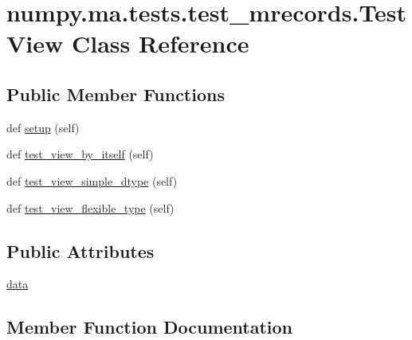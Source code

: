 \hypertarget{classnumpy_1_1ma_1_1tests_1_1test__mrecords_1_1TestView}{}\section{numpy.\+ma.\+tests.\+test\+\_\+mrecords.\+Test\+View Class Reference}
\label{classnumpy_1_1ma_1_1tests_1_1test__mrecords_1_1TestView}
\subsection*{Public Member Functions}
\begin{DoxyCompactItemize}
\item 
def \hyperlink{classnumpy_1_1ma_1_1tests_1_1test__mrecords_1_1TestView_aecb32f5a026d44e3bf3288cf8a7e335b}{setup} (self)
\item 
def \hyperlink{classnumpy_1_1ma_1_1tests_1_1test__mrecords_1_1TestView_abb276d0d84a546039027bd01c3802236}{test\+\_\+view\+\_\+by\+\_\+itself} (self)
\item 
def \hyperlink{classnumpy_1_1ma_1_1tests_1_1test__mrecords_1_1TestView_a5eae4dc212b68af0cd0617e790ecd1be}{test\+\_\+view\+\_\+simple\+\_\+dtype} (self)
\item 
def \hyperlink{classnumpy_1_1ma_1_1tests_1_1test__mrecords_1_1TestView_a108e3973e631fae0bd05a31d68f9c987}{test\+\_\+view\+\_\+flexible\+\_\+type} (self)
\end{DoxyCompactItemize}
\subsection*{Public Attributes}
\begin{DoxyCompactItemize}
\item 
\hyperlink{classnumpy_1_1ma_1_1tests_1_1test__mrecords_1_1TestView_adac73ac056ab0d0c963acd9208ef31ad}{data}
\end{DoxyCompactItemize}


\subsection{Member Function Documentation}
\mbox{\label{classnumpy_1_1ma_1_1tests_1_1test__mrecords_1_1TestView_aecb32f5a026d44e3bf3288cf8a7e335b}} 
